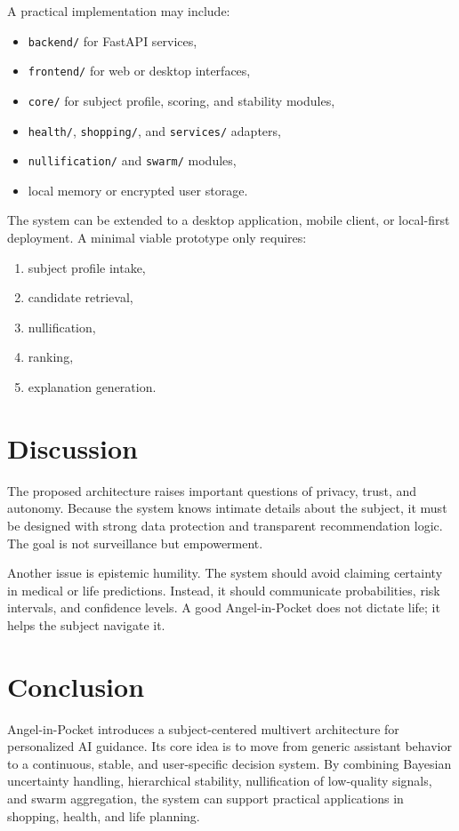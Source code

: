 \documentclass[11pt,a4paper]{article}
\begin{document}
A practical implementation may include:
\begin{itemize}[leftmargin=1.2em]
    \item \texttt{backend/} for FastAPI services,
    \item \texttt{frontend/} for web or desktop interfaces,
    \item \texttt{core/} for subject profile, scoring, and stability modules,
    \item \texttt{health/}, \texttt{shopping/}, and \texttt{services/} adapters,
    \item \texttt{nullification/} and \texttt{swarm/} modules,
    \item local memory or encrypted user storage.
\end{itemize}

The system can be extended to a desktop application, mobile client, or local-first deployment. A minimal viable prototype only requires:
\begin{enumerate}[leftmargin=1.2em]
    \item subject profile intake,
    \item candidate retrieval,
    \item nullification,
    \item ranking,
    \item explanation generation.
\end{enumerate}

\section{Discussion}

The proposed architecture raises important questions of privacy, trust, and autonomy. Because the system knows intimate details about the subject, it must be designed with strong data protection and transparent recommendation logic. The goal is not surveillance but empowerment.

Another issue is epistemic humility. The system should avoid claiming certainty in medical or life predictions. Instead, it should communicate probabilities, risk intervals, and confidence levels. A good Angel-in-Pocket does not dictate life; it helps the subject navigate it.

\section{Conclusion}

Angel-in-Pocket introduces a subject-centered multivert architecture for personalized AI guidance. Its core idea is to move from generic assistant behavior to a continuous, stable, and user-specific decision system. By combining Bayesian uncertainty handling, hierarchical stability, nullification of low-quality signals, and swarm aggregation, the system can support practical applications in shopping, health, and life planning.
\end{document}
